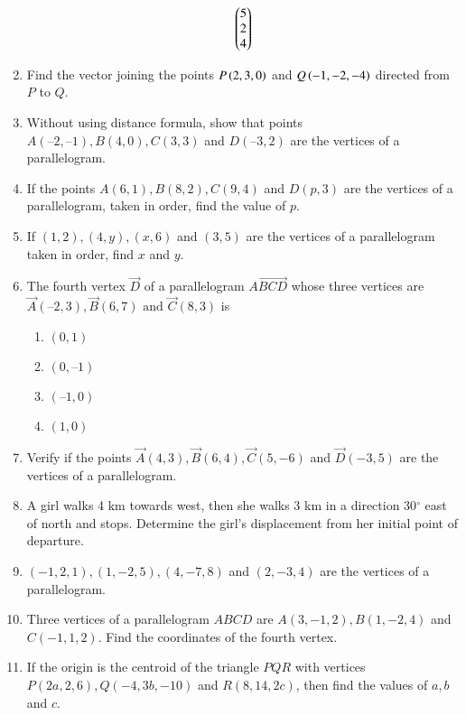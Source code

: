 \begin{enumerate}[label=\thesubsection.\arabic*,ref=\thesubsection.\theenumi]
\begin{align}
	\begin{pmatrix}5 \\ 2 \\ 4\end{pmatrix}  
\end{align}
\item Find the vector joining the points $P\left(2,3,0\right)$ and $Q\left(-1,-2,-4\right)$ directed from $P$ to $Q$.
\item Without using distance formula, show that points $A(– 2, – 1), B(4, 0), C(3, 3)$ and $D(–3, 2)$ are the vertices of a parallelogram.
\label{chapters/11/10/1/9}
\\
\solution

\item If the points $A(6, 1), B(8, 2), C(9, 4)$ and $D(p, 3)$ are the vertices of a parallelogram, taken in order, find the value of $p$.
\label{10/7/0/10}
\item 
If $(1, 2), (4, y), (x, 6)$ and $(3, 5)$ are the vertices of a parallelogram taken in order, find $x$ and $y$.
\label{10/7/2/6}
	\\
		\solution
	
\item The fourth vertex $\vec{D}$ of a parallelogram $\vec{ABCD}$ whose three vertices are
	$\vec{A} (–2, 3), \vec{B} (6, 7)\text { and } \vec{C} (8, 3)$ is
\begin{enumerate}
	\item $(0, 1)$
	\item $(0, –1)$
	\item $ (–1,0)$
	\item$(1, 0)$
\end{enumerate}
\item Verify if the points $\vec{A}(4,3), \vec{B}(6,4),\vec{C}(5,-6)$  and  $\vec{D}(-3,5)$ are the vertices of a parallelogram.
\item A girl walks 4 km towards west, then she walks 3 km in a direction 30$^{\circ}$ east of north and stops. Determine the girl's displacement from her initial point of departure.\\
	\solution
		
\item $(-1,2,1), (1,-2,5), (4,-7,8)$ and $(2,-3,4)$ are the vertices of a parallelogram.
\item Three vertices of a parallelogram $ABCD$ are $A(3,-1,2), B(1,-2,4)$ and $C(-1,1,2)$. Find the coordinates of the fourth vertex.
\item If the origin is the centroid of the triangle $PQR$ with vertices $P(2a,2,6), Q(-4,3b,-10)$ and $R(8,14,2c)$, then find the values of $a, b$ and $c$.
\end{enumerate}
